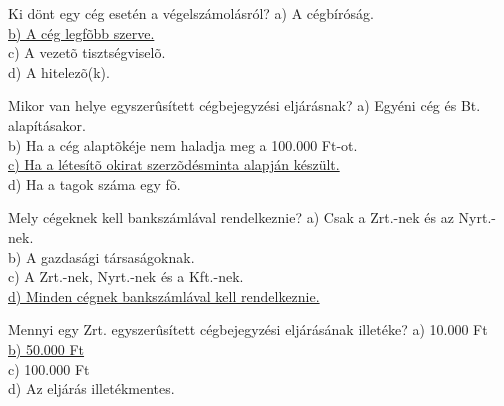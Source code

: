 \begin{frame}

\begin{tcolorbox}[title={98. Kérdés}]
Ki dönt egy cég esetén a végelszámolásról?
\tcblower
a) A cégbíróság.\\
\uline {b) A cég legfõbb szerve.}\\
c) A vezetõ tisztségviselõ.\\
d) A hitelezõ(k).
\end{tcolorbox}

\begin{tcolorbox}[title={99. Kérdés}]
Mikor van helye egyszerûsített cégbejegyzési eljárásnak?
\tcblower
a) Egyéni cég és Bt. alapításakor.\\
b) Ha a cég alaptõkéje nem haladja meg a 100.000 Ft-ot.\\
\uline {c) Ha a létesítõ okirat szerzõdésminta alapján készült.}\\
d) Ha a tagok száma egy fõ.
\end{tcolorbox}

\begin{tcolorbox}[title={100. Kérdés}]
Mely cégeknek kell bankszámlával rendelkeznie?
\tcblower
a) Csak a Zrt.-nek és az Nyrt.-nek.\\
b) A gazdasági társaságoknak.\\
c) A Zrt.-nek, Nyrt.-nek és a Kft.-nek.\\
\uline {d) Minden cégnek bankszámlával kell rendelkeznie.}
\end{tcolorbox}

\begin{tcolorbox}[title={101. Kérdés}]
Mennyi egy Zrt. egyszerûsített cégbejegyzési eljárásának illetéke?
\tcblower
a) 10.000 Ft\\
\uline {b) 50.000 Ft}\\
c) 100.000 Ft\\
d) Az eljárás illetékmentes.
\end{tcolorbox}

\end{frame}


